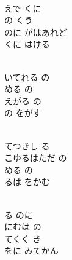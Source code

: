 \documentclass[10pt,b5j]{tarticle} %
\begin{document}
\vspace{1.5em} %
\newcommand{\linespace}{0.5em} %
\newcommand{\blocksize}{0.5\hsize} %
\newcommand{\itemmargin}{6em} %
\begin{enumerate} %
    \setlength{\itemindent}{\itemmargin} %
    \begin{minipage}[c]{\blocksize}
    
        \vspace{\linespace}
        \item~\\
        えで くに\\
        の くう\\
        のに がはあれど\\
        くに はける
        
        \vspace{\linespace}
        \item~\\
        いてれる の\\
        める の\\
        えがる の\\
        の をがす
        
        \vspace{\linespace}
        \item~\\
        てつきし る\\
        こゆるはただ の\\
        める の\\
        るは をかむ
        
        \vspace{\linespace}
        \item~\\
        る のに\\
        にむは の\\
        てくく き\\
        をに みてかん
    
    \end{minipage}
\end{enumerate} %
\end{document}
